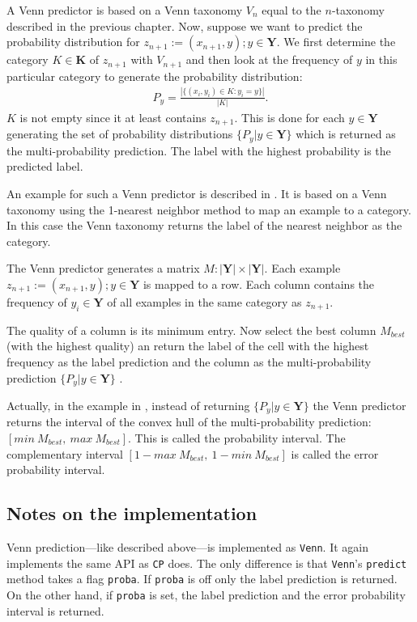 \documentclass[twoside,11pt]{article}
\begin{document}
A Venn predictor is based on a Venn taxonomy $V_n$ equal to
the $n$-taxonomy described in the previous chapter. Now,
suppose we want to predict the probability distribution for
$z_{n+1} := (x_{n+1}, y); y \in \textbf{Y}$.
We first determine the category $K \in \textbf{K}$ of
$z_{n+1}$ with $V_{n+1}$ and then look at the frequency of
$y$ in this particular category to generate the probability
distribution:
\begin{align*}
P_y = \frac{|\{(x_i,y_i) \in K: y_i = y\}|}{|K|}.
\end{align*}
$K$ is not empty since it at least contains $z_{n+1}$.
This is done for each $y \in \textbf{Y}$ generating the
set of probability distributions
$\{P_y|y \in \textbf{Y}\}$ which is returned as the
multi-probability prediction. The label with the highest
probability is the predicted label.

An example for such a Venn predictor is described in
\citet[Chapter 6.3]{alrw}. It is based on a Venn taxonomy
using the 1-nearest neighbor method to map an example to a
category.
In this case the Venn taxonomy returns the label of the
nearest neighbor as the category.

The Venn predictor generates a matrix
$M:|\textbf{Y}| \times |\textbf{Y}|$. Each example
$z_{n+1} := (x_{n+1},y);y \in \textbf{Y}$ is mapped to a
row.
Each column contains the frequency of $y_i \in \textbf{Y}$
of all examples in the same category as $z_{n+1}$.

The quality of a column is its minimum entry. Now select
the best column $M_{best}$ (with the highest quality) an
return the label of the cell with the highest frequency as
the label prediction and the column as the
multi-probability prediction $\{P_y|y\in \textbf{Y}\}$
\citep[see][Chapter 6.3]{alrw}.

Actually, in the example in \citet[Chapter 6.3]{alrw},
instead of returning $\{P_y|y \in \textbf{Y}\}$ the Venn
predictor returns the interval of the convex hull of the
multi-probability prediction:
$[min\ M_{best},\ max\ M_{best}]$.
This is called the probability interval. The complementary
interval $[1-max\ M_{best},\ 1-min\ M_{best}]$ is called
the error probability interval.

\subsection*{Notes on the implementation}

Venn prediction---like described above---is implemented as
\texttt{Venn}. It again implements the same API as
\texttt{CP} does. The only difference is that
\texttt{Venn}'s \texttt{predict} method takes a flag
\texttt{proba}. If \texttt{proba} is off only the label
prediction is returned. On the other hand, if
\texttt{proba} is set, the label prediction and the error
probability interval is returned.
\end{document}
